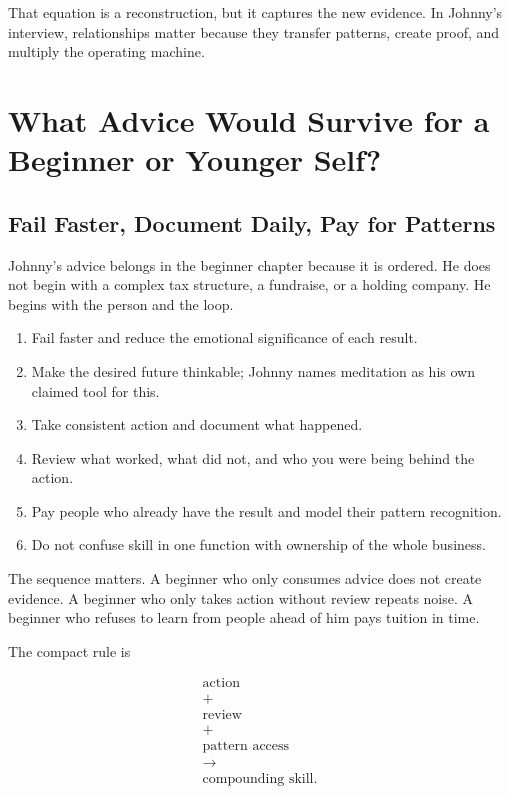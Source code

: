 \documentclass[11pt,oneside]{book}
\begin{document}
That equation is a reconstruction, but it captures the new evidence. In Johnny's interview, relationships matter because they transfer patterns, create proof, and multiply the operating machine.

\chapter{What Advice Would Survive for a Beginner or Younger Self?}

\section{Fail Faster, Document Daily, Pay for Patterns}

Johnny's advice belongs in the beginner chapter because it is ordered. He does not begin with a complex tax structure, a fundraise, or a holding company. He begins with the person and the loop.

\begin{enumerate}
\item Fail faster and reduce the emotional significance of each result.
\item Make the desired future thinkable; Johnny names meditation as his own claimed tool for this.
\item Take consistent action and document what happened.
\item Review what worked, what did not, and who you were being behind the action.
\item Pay people who already have the result and model their pattern recognition.
\item Do not confuse skill in one function with ownership of the whole business.
\end{enumerate}

The sequence matters. A beginner who only consumes advice does not create evidence. A beginner who only takes action without review repeats noise. A beginner who refuses to learn from people ahead of him pays tuition in time.

The compact rule is

\begin{equation}
\begin{gathered}
\text{action}\\
+\\
\text{review}\\
+\\
\text{pattern access}\\
\longrightarrow\\
\text{compounding skill}.
\end{gathered}
\end{equation}
\end{document}
